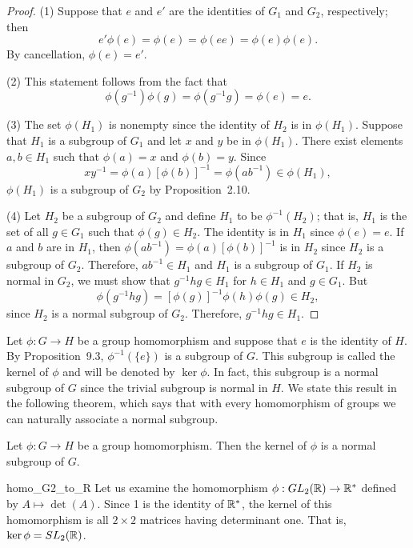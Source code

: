  
\begin{proof}
(1)
Suppose that $e$ and $e'$ are the identities of $G_1$ and $G_2$,
respectively; then
$$
e' \phi(e) = \phi(e) = \phi(e e) = \phi(e) \phi(e).
$$
By cancellation, $\phi(e) = e'$.
 
 
(2)
This statement follows from the fact that
$$
\phi( g^{-1}) \phi(g) = \phi(g^{-1} g) = \phi(e) = e.
$$
 
 
(3)
The set $\phi(H_1)$ is nonempty since the identity of $H_2$ is in
$\phi(H_1)$.
Suppose that $H_1$ is a subgroup of $G_1$ and let $x$ and $y$ be in
$\phi(H_1)$. There exist elements $a, b \in H_1$ such that $\phi(a) =
x$ and $\phi(b)=y$. Since 
$$
xy^{-1} = \phi(a)[ \phi(b)]^{-1} = \phi(a b^{-1} ) \in \phi(H_1),
$$
$\phi(H_1)$ is a subgroup of $G_2$ by Proposition~2.10.
 
 
(4)
Let $H_2$ be a subgroup of $G_2$ and define $H_1$ to be
$\phi^{-1}(H_2)$; that is, $H_1$ is the set of all $g \in G_1$ such
that $\phi(g) \in H_2$.  The identity is in $H_1$ since $\phi(e) = e$.
If $a$ and $b$ are in $H_1$, then $\phi(ab^{-1}) = \phi(a)[ \phi(b)
]^{-1}$ is in $H_2$ since $H_2$ is a subgroup of $G_2$.  Therefore,
$ab^{-1} \in H_1$ and $H_1$ is a subgroup of $G_1$. If $H_2$ is normal
in $G_2$, we must show that $g^{-1} h g \in H_1$ for $h \in H_1$ and
$g \in G_1$. But 
$$
\phi( g^{-1} h g) = [ \phi(g) ]^{-1} \phi( h ) \phi( g ) \in
H_2,
$$
since $H_2$ is a normal subgroup of $G_2$.  Therefore, $g^{-1}hg \in
H_1$.
\end{proof}
 
 
\medskip
 
 
Let $\phi : G \rightarrow H$ be a group homomorphism and suppose that
$e$ is the identity of $H$. By Proposition~9.3, $\phi^{-1} ( \{ e \}
)$ is a subgroup of $G$. This subgroup is called the {\bfi
kernel\/} of $\phi$ and will
be denoted by $\ker \phi$\label{kernelofphi}.  In fact, this subgroup
is a normal subgroup of $G$ since the trivial subgroup is normal in
$H$.  We state this result in the following theorem, which says that
with every homomorphism of groups we can naturally associate a normal
subgroup.   
 
 
\begin{theorem}
Let $\phi : G \rightarrow H$ be a group homomorphism. Then the kernel
of $\phi$ is a normal subgroup of $G$. 
\end{theorem}
 
 
\begin{example}{homo_G2_to_R}
Let us examine the homomorphism $\phi : GL_2( {\Bbb R }) \rightarrow
{\Bbb R}^\ast$ defined by $A \mapsto \det( A )$. Since 1 is the
identity of ${\Bbb R}^\ast$, the kernel of this homomorphism is all
$2 \times 2$ matrices having determinant one. That is, $\ker \phi =
SL_2( {\Bbb R })$.
\mbox{\hspace{1in}}
\end{example}
 
